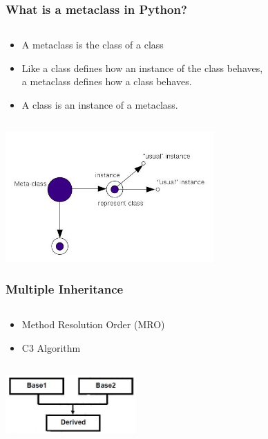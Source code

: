\documentclass{beamer}
\begin{document}
\begin{frame}
	\frametitle{What is a metaclass in Python?}
	\begin{columns}[c]
		\begin{column}{30cm}
			\vspace{.1cm}
			\begin{itemize}
				\justifying
				\item A metaclass is the class of a class
				\item Like a class defines how an instance of the class behaves,\\
				 a metaclass defines how a class behaves.
				 \item A class is an instance of a metaclass.
			\end{itemize}
		\end{column}
	\end{columns}
	\vspace{.5cm}
	\hspace*{2cm} \includegraphics[width=8cm]{figs/meta-class.jpg}
\end{frame}


\begin{frame}
	\frametitle{Multiple Inheritance}
	\begin{columns}[c]
		\begin{column}{30cm}
			\vspace{.1cm}
			\begin{itemize}
				\justifying
				\item Method Resolution Order (MRO)
				\item C3 Algorithm
			\end{itemize}
		\end{column}
	\end{columns}
	\vspace{1cm}
	\hspace*{5.5cm} \includegraphics[width=5cm]{figs/multiple-inheritance.jpg}
\end{frame}
\end{document}
